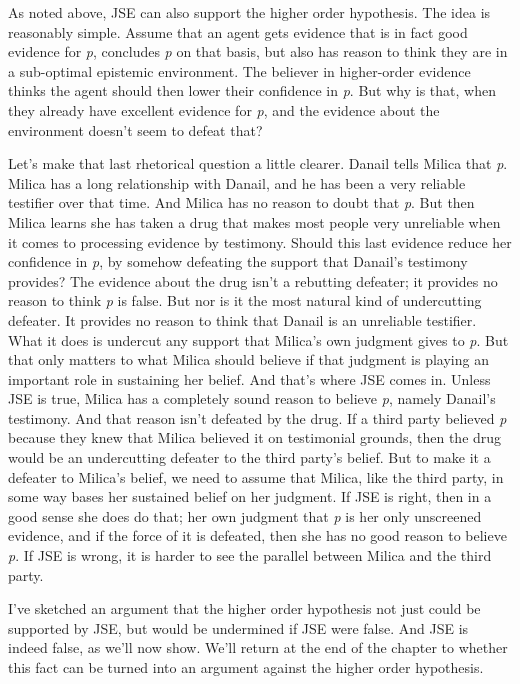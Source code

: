 \documentclass[
  10pt,
  letterpaper,
  twoside]{scrbook}
\begin{document}
As noted above, JSE can also support the higher order hypothesis. The
idea is reasonably simple. Assume that an agent gets evidence that is in
fact good evidence for \emph{p}, concludes \emph{p} on that basis, but
also has reason to think they are in a sub-optimal epistemic
environment. The believer in higher-order evidence thinks the agent
should then lower their confidence in \emph{p}. But why is that, when
they already have excellent evidence for \emph{p}, and the evidence
about the environment doesn't seem to defeat that?

Let's make that last rhetorical question a little clearer. {Danail}
tells {Milica} that \emph{p}. {Milica} has a long relationship with
{Danail}, and he has been a very reliable testifier over that time. And
{Milica} has no reason to doubt that \emph{p}. But then {Milica} learns
she has taken a drug that makes most people very unreliable when it
comes to processing evidence by testimony. Should this last evidence
reduce her confidence in \emph{p}, by somehow defeating the support that
{Danail}'s testimony provides? The evidence about the drug isn't a
rebutting defeater; it provides no reason to think \emph{p} is false.
But nor is it the most natural kind of undercutting defeater. It
provides no reason to think that {Danail} is an unreliable testifier.
What it does is undercut any support that {Milica}'s own judgment gives
to \emph{p}. But that only matters to what {Milica} should believe if
that judgment is playing an important role in sustaining her belief. And
that's where JSE comes in. Unless JSE is true, {Milica} has a completely
sound reason to believe \emph{p}, namely {Danail}'s testimony. And that
reason isn't defeated by the drug. If a third party believed \emph{p}
because they knew that {Milica} believed it on testimonial grounds, then
the drug would be an undercutting defeater to the third party's belief.
But to make it a defeater to {Milica}'s belief, we need to assume that
{Milica}, like the third party, in some way bases her sustained belief
on her judgment. If JSE is right, then in a good sense she does do that;
her own judgment that \emph{p} is her only unscreened evidence, and if
the force of it is defeated, then she has no good reason to believe
\emph{p}. If JSE is wrong, it is harder to see the parallel between
{Milica} and the third party.

I've sketched an argument that the higher order hypothesis not just
could be supported by JSE, but would be undermined if JSE were false.
And JSE is indeed false, as we'll now show. We'll return at the end of
the chapter to whether this fact can be turned into an argument against
the higher order hypothesis.
\end{document}
